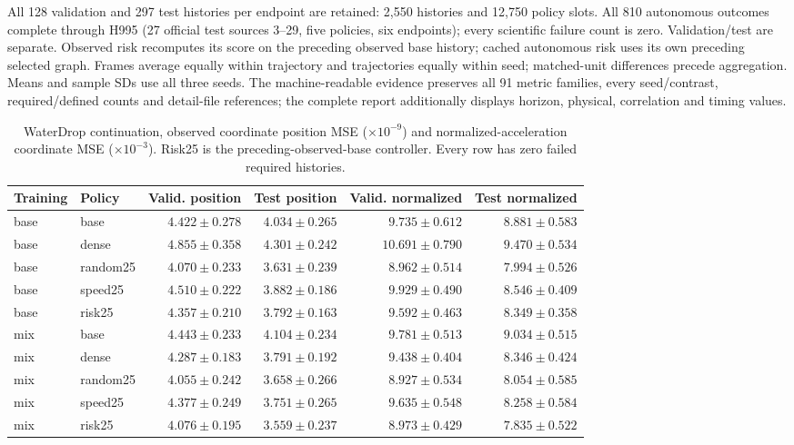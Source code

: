 All 128 validation and 297 test histories per endpoint are retained: 2,550 histories and 12,750 policy slots. All 810 autonomous outcomes complete through H995 (27 official test sources 3--29, five policies, six endpoints); every scientific failure count is zero. Validation/test are separate. Observed risk recomputes its score on the preceding observed base history; cached autonomous risk uses its own preceding selected graph. Frames average equally within trajectory and trajectories equally within seed; matched-unit differences precede aggregation. Means and sample SDs use all three seeds. The machine-readable evidence preserves all 91 metric families, every seed/contrast, required/defined counts and detail-file references; the complete report additionally displays horizon, physical, correlation and timing values.

\begin{table}[p]\centering\scriptsize
\caption{WaterDrop continuation, observed coordinate position MSE ($\times10^{-9}$) and normalized-acceleration coordinate MSE ($\times10^{-3}$). Risk25 is the preceding-observed-base controller. Every row has zero failed required histories.}
\label{tab:waterdrop110k-observed}
\begin{tabular}{llrrrr}\toprule
Training & Policy & Valid. position & Test position & Valid. normalized & Test normalized\\\midrule
base & base & $4.422\pm0.278$ & $4.034\pm0.265$ & $9.735\pm0.612$ & $8.881\pm0.583$\\
base & dense & $4.855\pm0.358$ & $4.301\pm0.242$ & $10.691\pm0.790$ & $9.470\pm0.534$\\
base & random25 & $4.070\pm0.233$ & $3.631\pm0.239$ & $8.962\pm0.514$ & $7.994\pm0.526$\\
base & speed25 & $4.510\pm0.222$ & $3.882\pm0.186$ & $9.929\pm0.490$ & $8.546\pm0.409$\\
base & risk25 & $4.357\pm0.210$ & $3.792\pm0.163$ & $9.592\pm0.463$ & $8.349\pm0.358$\\
mix & base & $4.443\pm0.233$ & $4.104\pm0.234$ & $9.781\pm0.513$ & $9.034\pm0.515$\\
mix & dense & $4.287\pm0.183$ & $3.791\pm0.192$ & $9.438\pm0.404$ & $8.346\pm0.424$\\
mix & random25 & $4.055\pm0.242$ & $3.658\pm0.266$ & $8.927\pm0.534$ & $8.054\pm0.585$\\
mix & speed25 & $4.377\pm0.249$ & $3.751\pm0.265$ & $9.635\pm0.548$ & $8.258\pm0.584$\\
mix & risk25 & $4.076\pm0.195$ & $3.559\pm0.237$ & $8.973\pm0.429$ & $7.835\pm0.522$\\
\bottomrule\end{tabular}\end{table}

